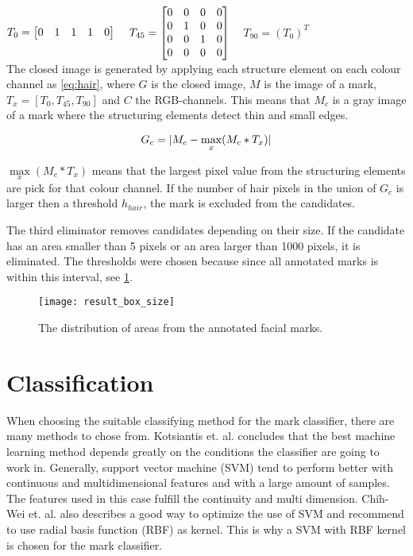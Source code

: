 $T_{0} =
\left[ \begin{array}{@{}*{5}{c}@{}}
0 & 1 & 1 & 1 & 0  \\
\end{array} \right]  $ ~ $T_{45} =
\left[ \begin{array}{@{}*{4}{c}@{}}
0 & 0 & 0 & 0 \\
0 & 1 & 0 & 0 \\
0 & 0 & 1 & 0 \\
0 & 0 & 0 & 0  \\
\end{array} \right]$ ~ $T_{90} = (T_{0})^{T} $ \\

The closed image is generated by applying each structure element on each colour channel as \eqref{eq:hair}, where $G$ is the closed image, $M$ is the image of a mark, $T_x = [T_{0}, T_{45}, T_{90} ]$ and $C$ the RGB-channels. This means that $M_c$ is a gray image of a mark where the structuring elements detect thin and small edges.    

\begin{equation} \label{eq:hair}
G_c = \lvert M_c - \max_{x}(M_c * T_x)\rvert 
\end{equation}

$\max\limits_x(M_c * T_x)$ means that the largest pixel value from the structuring elements are pick for that colour channel. If the number of hair pixels in the union of $G_c$ is larger then a threshold $h_{hair}$, the mark is excluded from the candidates. 

The third eliminator removes candidates depending on their size. If the candidate has an area smaller than 5 pixels or an area larger than 1000 pixels, it is eliminated. The thresholds were chosen because since all annotated marks is within this interval, see \cref{fig:result_box_size}.    

\begin{figure}[h]
	\centering
	\texttt{[image: result\_box\_size]}
	\caption{The distribution of areas from the annotated facial marks.  \label{fig:result_box_size}}
\end{figure}

\section{Classification}

When choosing the suitable classifying method for the mark classifier, there are many methods to chose from. Kotsiantis et. al. \cite{machine_learning} concludes that the best machine learning method depends greatly on the conditions the classifier are going to work in. Generally, support vector machine (SVM) tend to perform better with continuous and multidimensional features and with a large amount of samples. The features used in this case fulfill the continuity and multi dimension. Chih-Wei et. al. \cite{svm_guide} also describes a good way to optimize the use of SVM and recommend to use radial basis function (RBF) as kernel. This is why a SVM with RBF kernel is chosen for the mark classifier.  

